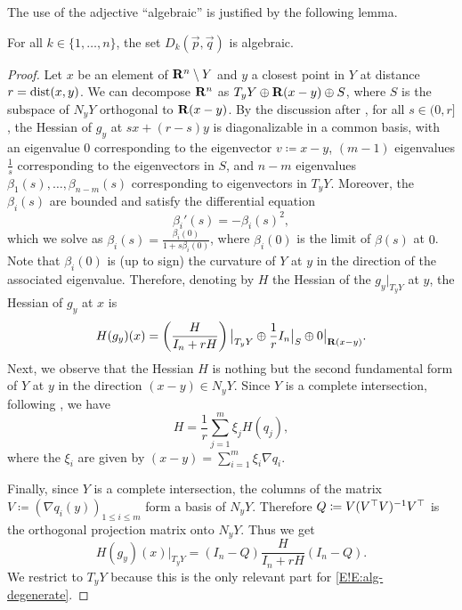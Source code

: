 The use of the adjective ``algebraic'' is justified by the following lemma.

\begin{lemma}
\label{E!L:alg-deg-is-alg}
  For all $k \in \{1, \ldots, n\}$, the set $D_k(\vec{p}, \vec{q})$ is algebraic.
\end{lemma}

\begin{proof}
  Let $x$ be an element of $\mathbf{R}^n \setminus Y$ and $y$ a closest point in $Y$ at distance $r = \operatorname{dist}(x, y)$. We can decompose $\mathbf{R}^n$ as $T_y Y \oplus \mathbf{R}(x - y) \oplus S$, where $S$ is the subspace of $N_y Y$ orthogonal to $\mathbf{R}(x - y)$. By the discussion after \cite[Proposition 3.3]{Mantegazza2010}, for all $s \in (0, r]$, the Hessian of $g_y$ at $s x + (r - s) y$ is diagonalizable in a common basis, with an eigenvalue $0$ corresponding to the eigenvector $v \coloneq x - y$, $(m - 1)$ eigenvalues $\frac{1}{s}$ corresponding to the eigenvectors in $S$, and $n - m$ eigenvalues $\beta_1(s), \ldots, \beta_{n - m}(s)$ corresponding to eigenvectors in $T_y Y$. Moreover, the $\beta_i(s)$ are bounded and satisfy the differential equation
  \[
    \beta_i'(s) = -\beta_i(s)^2,
  \]
  which we solve as $\beta_i(s) = \frac{\beta_i(0)}{1 + s \beta_i(0)}$, where $\beta_i(0)$ is the limit of $\beta(s)$ at $0$. Note that $\beta_i(0)$ is (up to sign) the curvature of $Y$ at $y$ in the direction of the associated eigenvalue. Therefore, denoting by $H$ the Hessian of the $g_y|_{T_y Y}$ at $y$, the Hessian of $g_y$ at $x$ is
  \[
    H(g_y)(x) = \left( \frac{H}{I_n + r H} \right) \big|_{T_y Y} \oplus \frac{1}{r} I_n \big|_{S} \oplus 0 \big|_{\mathbf{R}(x - y)}.
  \]
  Next, we observe that the Hessian $H$ is nothing but the second fundamental form of $Y$ at $y$ in the direction $(x - y) \in N_y Y$.
  Since $Y$ is a complete intersection, following \cite[]{BKS2024}, we have
  \[
    H = \frac{1}{r} \sum_{j = 1}^m \xi_j H(q_j),
  \]
  where the $\xi_i$ are given by $(x - y) = \sum_{i = 1}^m \xi_i \nabla q_i$.
  
  Finally, since $Y$ is a complete intersection, the columns of the matrix $V \coloneq (\nabla q_i(y))_{1 \leq i \leq m}$ form a basis of $N_y Y$. Therefore $Q \coloneq V (V^\top V)^{-1} V^\top$ is the orthogonal projection matrix onto $N_y Y$. Thus we get
  \[
    H(g_y)(x)\big|_{T_y Y} = (I_n - Q) \frac{H}{I_n + r H} (I_n - Q).
  \]
  We restrict to $T_y Y$ because this is the only relevant part for \eqref{E!E:alg-degenerate}.
  

\end{proof}

